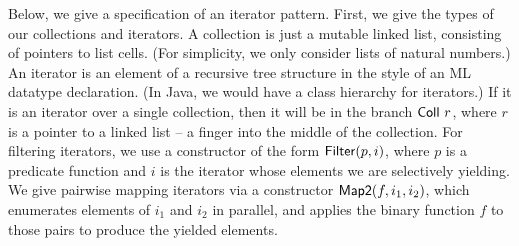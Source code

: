 \documentclass[preprint,natbib]{sigplanconf}
\begin{document}
Below, we give a specification of an iterator pattern. First, we 
give the types of our collections and iterators. A collection is just
a mutable linked list, consisting of pointers to list cells. (For
simplicity, we only consider lists of natural numbers.) An iterator is
an element of a recursive tree structure in the style of an ML
datatype declaration. (In Java, we would have a class hierarchy for
iterators.) If it is an iterator over a single collection, then it
will be in the branch $\mbox{\textsf{{Coll }}}r$, where $r$ is a pointer to a
linked list -- a finger into the middle of the collection. For filtering
iterators, we use a constructor of the form $\mbox{\textsf{{Filter}}}(p, i)$,
where $p$ is a predicate function and $i$ is the iterator whose
elements we are selectively yielding. We give pairwise mapping
iterators via a constructor $\mbox{\textsf{{Map2}}}(f, i_1, i_2)$, which
enumerates elements of $i_1$ and $i_2$ in parallel, and applies the
binary function $f$ to those pairs to produce the yielded elements.
\end{document}
